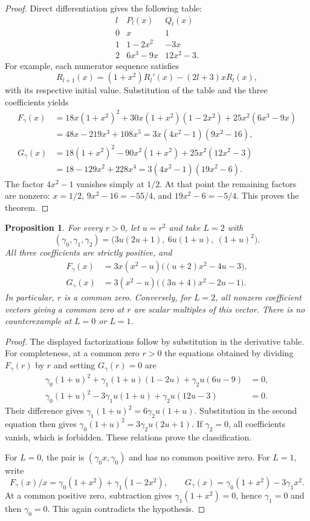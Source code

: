 \documentclass[11pt]{article}
\newtheorem{proposition}[theorem]{Proposition}
\begin{document}
\begin{proof}
Direct differentiation gives the following table:
\[
\begin{array}{c|cc}
 l&P_l(x)&Q_l(x)\\\hline
 0&x&1\\
 1&1-2x^2&-3x\\
 2&6x^3-9x&12x^2-3.
\end{array}
\]
For example, each numerator sequence satisfies
\[
 R_{l+1}(x)=(1+x^2)R_l'(x)-(2l+3)xR_l(x),
\]
with its respective initial value. Substitution of the table and the
three coefficients yields
\begin{align*}
 F_\gamma(x)
 &=18x(1+x^2)^2+30x(1+x^2)(1-2x^2)
       +25x^2(6x^3-9x)\\
 &=48x-219x^3+108x^5
 =3x(4x^2-1)(9x^2-16),\\
 G_\gamma(x)
 &=18(1+x^2)^2-90x^2(1+x^2)+25x^2(12x^2-3)\\
 &=18-129x^2+228x^4
 =3(4x^2-1)(19x^2-6).
\end{align*}
The factor $4x^2-1$ vanishes simply at $1/2$. At that point the remaining
factors are nonzero: $x=1/2$, $9x^2-16=-55/4$, and
$19x^2-6=-5/4$. This proves the theorem.
\end{proof}

\begin{proposition}\label{prop:family}
For every $r>0$, let $u=r^2$ and take $L=2$ with
\[
 (\gamma_0,\gamma_1,\gamma_2)
 =\bigl(3u(2u+1),\ 6u(1+u),\ (1+u)^2\bigr).
\]
All three coefficients are strictly positive, and
\begin{align*}
 F_\gamma(x)&=3x(x^2-u)\bigl((u+2)x^2-4u-3\bigr),\\
 G_\gamma(x)&=3(x^2-u)\bigl((3u+4)x^2-2u-1\bigr).
\end{align*}
In particular, $r$ is a common zero. Conversely, for $L=2$, all nonzero
coefficient vectors giving a common zero at $r$ are scalar multiples of
this vector. There is no counterexample at $L=0$ or $L=1$.
\end{proposition}

\begin{proof}
The displayed factorizations follow by substitution in the derivative
table. For completeness, at a common zero $r>0$ the equations obtained
by dividing $F_\gamma(r)$ by $r$ and setting $G_\gamma(r)=0$ are
\begin{align*}
 \gamma_0(1+u)^2+\gamma_1(1+u)(1-2u)
       +\gamma_2u(6u-9)&=0,\\
 \gamma_0(1+u)^2-3\gamma_1u(1+u)
       +\gamma_2u(12u-3)&=0.
\end{align*}
Their difference gives
$\gamma_1(1+u)^2=6\gamma_2u(1+u)$.
Substitution in the second equation then gives
$\gamma_0(1+u)^2=3\gamma_2u(2u+1)$.
If $\gamma_2=0$, all coefficients vanish, which is forbidden.
These relations prove the classification.

For $L=0$, the pair is $(\gamma_0x,\gamma_0)$ and has no common
positive zero. For $L=1$, write
\[
 F_\gamma(x)/x=\gamma_0(1+x^2)+\gamma_1(1-2x^2),\qquad
 G_\gamma(x)=\gamma_0(1+x^2)-3\gamma_1x^2.
\]
At a common positive zero, subtraction gives
$\gamma_1(1+x^2)=0$, hence $\gamma_1=0$ and then $\gamma_0=0$.
This again contradicts the hypothesis.
\end{proof}
\end{document}
